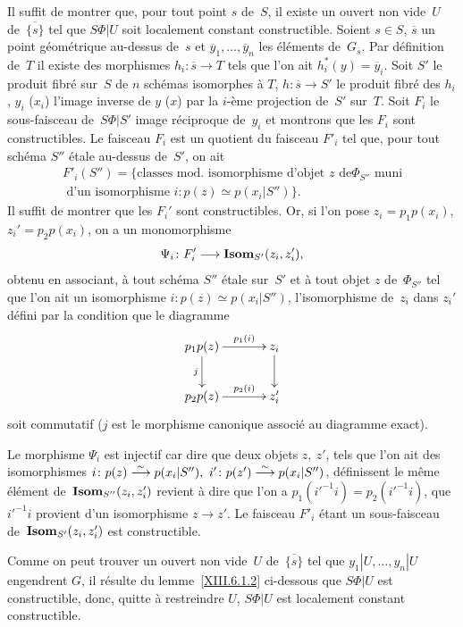 Il suffit de montrer que, pour tout point $s$ de~$S$, il existe un
ouvert non vide~$U$ de~$\overline{\{ s\} }$ tel que $S\Phi|U$ soit
localement constant constructible. Soient $s\in S$, $\overline{s}$ un
point g\'eom\'etrique au-dessus de~$s$ et $\overline{y}_1,\dots,\overline{y}_n$ les \'el\'ements de~$G_{\overline{s}}$. Par
d\'efinition de~$T$ il existe des morphismes
$h_i\colon\overline{s}\to T$ tels que l'on ait
$h_i^*(y)=\overline{y}_i$. Soit $S'$ le produit fibr\'e sur~$S$ de
$n$ sch\'emas isomorphes \`a $T$, $h\colon\overline{s}\to S'$ le
produit fibr\'e des $h_i$, $y_i$ (\resp $x_i$) l'image inverse de
$y$ (\resp $x$) par la $i$-\`eme projection de~$S'$ sur~$T$. Soit
$F_i$ le sous-faisceau de~$S\Phi |S'$ image r\'eciproque de~$y_i$
et montrons que les $F_i$ sont constructibles. Le faisceau $F_i$ est
un quotient du faisceau $F'_i$ tel que, pour tout sch\'ema $S''$
\'etale au-dessus de~$S'$, on ait
\begin{multline*}
F'_i(S'') = \{\text{classes mod. isomorphisme d'objet $z$ de
$\Phi_{S''}$ muni}\\
\text{ d'un isomorphisme $i\colon p(z)\simeq p(x_i|S'')$}\}.
\end{multline*}
Il suffit de montrer que les $F_i'$ sont constructibles. Or, si l'on
pose $z_i=p_1p(x_i)$, $z_i'=p_2p(x_i)$, on a un monomorphisme
$$
\Psi_i\colon F'_i\to\SheafIsom_{S'}(z_i,z_i'),
$$
obtenu en associant, \`a tout sch\'ema $S''$ \'etale sur~$S'$ et
\`a tout objet $z$ de~$\Phi_{S''}$ tel que l'on ait un isomorphisme
$i\colon p(z)\simeq p(x_i|S'')$, l'isomorphisme de~$z_i$ dans $z_i'$
d\'efini par la condition que le diagramme
$$
\xymatrix@C=1.2cm{{p_1p(z)}\ar[r]^-{p_1(i)}\ar[d]_-j&{z_i}\ar[d]\\{p_2p(z)}\ar[r]^-{p_2(i)}&{z'_i}}
$$
soit commutatif ($j$ est le morphisme canonique associ\'e au
diagramme exact).

Le morphisme $\Psi_i$ est injectif car dire que deux objets $z,~z'$,
tels que l'on ait des isomorphismes $i\colon p(z)\overset{\sim}{\longrightarrow}
p(x_i|S''),~i'\colon p(z')\overset{\sim}{\longrightarrow} p(x_i|S'')$, d\'efinissent le
m\^eme \'el\'ement de~$\operatorname{\mathbf{Isom}}_{S''}(z_i,z'_i)$ revient \`a
dire que l'on a $p_1(i'^{-1}i)=p_2(i'^{-1}i)$, \ie que $i'^{-1}i$
provient d'un isomorphisme $z\to z'$. Le faisceau $F'_i$ \'etant un
sous-faisceau de~$\operatorname{\mathbf{Isom}}_{S'}(z_i,z'_i)$ est constructible.

Comme on peut trouver un ouvert non vide~$U$ de~$\overline{\{ s\}}$
tel que $y_1|U,\dots,y_n|U$ engendrent $G$, il r\'esulte du
lemme~\ref{XIII.6.1.2} ci-dessous que $S\Phi |U$ est constructible,
donc, quitte \`a restreindre $U$, $S\Phi |U$ est localement constant
constructible.

